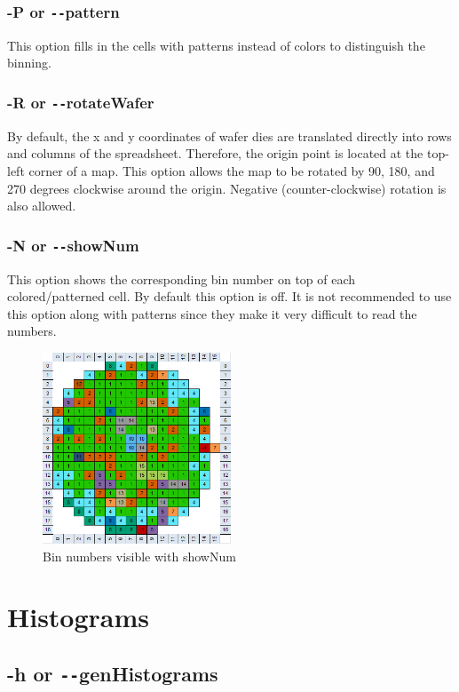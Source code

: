 \documentclass[letterpaper]{article}
\begin{document}
\subsubsection{\bf -P or \texttt{-{}-}pattern}
This option fills in the cells with patterns instead of colors to distinguish the binning.
\subsubsection{\bf -R or \texttt{-{}-}rotateWafer}
By default, the x and y coordinates of wafer dies are translated directly into rows and columns of the spreadsheet. Therefore, the origin point is located at the top-left corner of a map. This option allows the map to be rotated by 90, 180, and 270 degrees clockwise around the origin. Negative (counter-clockwise) rotation is also allowed.
\subsubsection{\bf -N or \texttt{-{}-}showNum}
This option shows the corresponding bin number on top of each colored/patterned cell. By default this option is off. It is not recommended to use this option along with patterns since they make it very difficult to read the numbers.
\begin{figure}[H]
	\centering
	\includegraphics[width=0.5\textwidth]{showNum.png}
	\caption{Bin numbers visible with showNum}
	\label{fig:showNum}
\end{figure}

\section{\bf Histograms}
\subsection{\bf -h or \texttt{-{}-}genHistograms}
\end{document}
